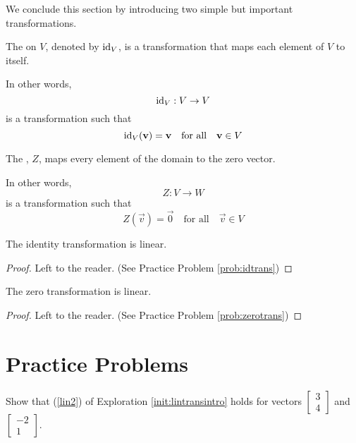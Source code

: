 \documentclass{ximera}
\begin{document}
\begin{example}
\begin{explanation}
\end{explanation}
\end{example}

We conclude this section by introducing two simple but important transformations.

\begin{definition}\label{def:idtransonrn}
The  on $V$, denoted by $\text{id}_V$, is a transformation that maps each element of $V$ to itself.

In other words,
$$\text{id}_V:V\rightarrow V$$ is a transformation such that $$\text{id}_V(\mathbf{v})=\mathbf{v}\quad\text{for all}\quad \mathbf{v} \in V$$
\end{definition}

\begin{definition}\label{def:zerotransonrn}
The , $Z$, maps every element of the domain to the zero vector.

In other words,
$$Z:V\rightarrow W$$ is a transformation such that $$Z(\vec{v})=\vec{0}\quad\text{for all}\quad \vec{v} \in V$$
\end{definition}

\begin{theorem}\label{th:idlintrans}
The identity transformation is linear.
\end{theorem}
\begin{proof}
Left to the reader. (See Practice Problem \ref{prob:idtrans})
\end{proof}

\begin{theorem}\label{th:zerolintrans}
The zero transformation is linear.
\end{theorem}
\begin{proof}
Left to the reader.  (See Practice Problem \ref{prob:zerotrans})
\end{proof}


\section*{Practice Problems}
\begin{problem}\label{prob:sum}

Show that (\ref{lin2}) of Exploration \ref{init:lintransintro} holds for vectors $\begin{bmatrix}3\\4\end{bmatrix}$ and $\begin{bmatrix}-2\\1\end{bmatrix}$.
\end{problem}
\end{document}
